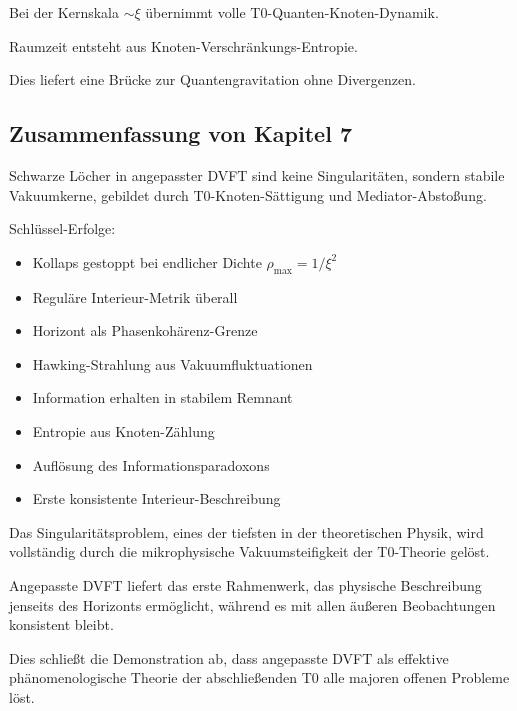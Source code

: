 \documentclass[12pt,a4paper]{article}
\begin{document}
	Bei der Kernskala $\sim \xi$ übernimmt volle T0-Quanten-Knoten-Dynamik.
	
	Raumzeit entsteht aus Knoten-Verschränkungs-Entropie.
	
	Dies liefert eine Brücke zur Quantengravitation ohne Divergenzen.
	
	\subsection{Zusammenfassung von Kapitel 7}
	
	Schwarze Löcher in angepasster DVFT sind keine Singularitäten, sondern stabile Vakuumkerne, gebildet durch T0-Knoten-Sättigung und Mediator-Abstoßung.
	
	Schlüssel-Erfolge:
	\begin{itemize}
		\item Kollaps gestoppt bei endlicher Dichte $\rho_{\text{max}} = 1/\xi^2$
		\item Reguläre Interieur-Metrik überall
		\item Horizont als Phasenkohärenz-Grenze
		\item Hawking-Strahlung aus Vakuumfluktuationen
		\item Information erhalten in stabilem Remnant
		\item Entropie aus Knoten-Zählung
		\item Auflösung des Informationsparadoxons
		\item Erste konsistente Interieur-Beschreibung
	\end{itemize}
	
	Das Singularitätsproblem, eines der tiefsten in der theoretischen Physik, wird vollständig durch die mikrophysische Vakuumsteifigkeit der T0-Theorie gelöst.
	
	Angepasste DVFT liefert das erste Rahmenwerk, das physische Beschreibung jenseits des Horizonts ermöglicht, während es mit allen äußeren Beobachtungen konsistent bleibt.
	
	Dies schließt die Demonstration ab, dass angepasste DVFT als effektive phänomenologische Theorie der abschließenden T0 alle majoren offenen Probleme löst.
	
\end{document}
